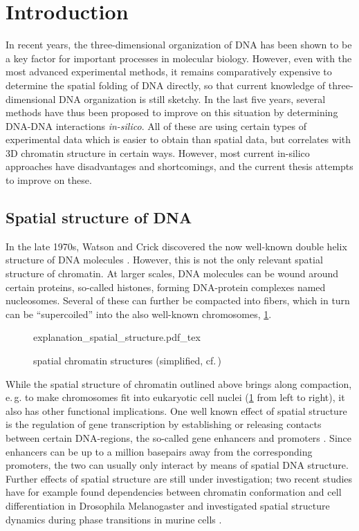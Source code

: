 \section{Introduction}
In recent years, the three-dimensional organization of DNA has been shown to 
be a key factor for important processes in molecular biology.
However, even with the most advanced experimental methods, 
it remains comparatively expensive to determine the spatial folding of DNA directly,
so that current knowledge of three-dimensional DNA organization is still sketchy.
In the last five years, several methods have thus been proposed to improve on this situation
by determining DNA-DNA interactions \emph{in-silico}.
All of these are using certain types of experimental data which is easier to obtain than spatial data, but correlates with 3D chromatin structure in certain ways.
However, most current in-silico approaches have disadvantages and shortcomings,
and the current thesis attempts to improve on these.

\subsection{Spatial structure of DNA}
In the late 1970s, Watson and Crick discovered the now well-known double helix structure of DNA molecules \cite{Watson1953}.
However, this is not the only relevant spatial structure of chromatin. 
At larger scales, DNA molecules can be wound around certain proteins, so-called histones, forming DNA-protein complexes named nucleosomes.
Several of these can further be compacted into fibers, which in turn can be ``supercoiled'' into the also well-known chromosomes, \cref{fig:intro:spatial_chrom_structures}.
\begin{figure}[h!]
 \small
 \centering
 {explanation_spatial_structure.pdf_tex}
 \caption{spatial chromatin structures (simplified, cf.\,\cite{Lee2001})} \label{fig:intro:spatial_chrom_structures}
\end{figure}

While the spatial structure of chromatin outlined above brings along compaction, 
e.\,g. to make chromosomes fit into eukaryotic cell nuclei (\cref{fig:intro:spatial_chrom_structures} from left to right), 
it also has other functional implications.
One well known effect of spatial structure is the regulation of gene transcription by establishing or releasing contacts
between certain DNA-regions, the so-called gene enhancers and promoters \cite{Smallwood2013,Gorkin2014}.
Since enhancers can be up to a million basepairs away from the corresponding promoters, 
the two can usually only interact by means of spatial DNA structure.
Further effects of spatial structure are still under investigation;
two recent studies have for example found dependencies between chromatin conformation 
and cell differentiation in Drosophila Melanogaster \cite{Chathoth2019}
and investigated spatial structure dynamics during phase transitions in murine cells \cite{Zhang2019b}.

